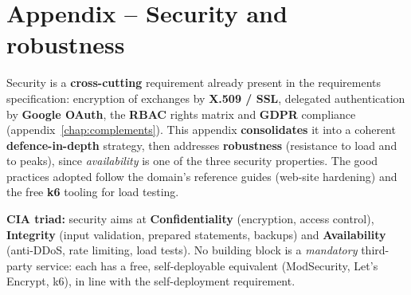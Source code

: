 
\chapter{Appendix -- Security and robustness}
\label{chap:securite}
Security is a \textbf{cross-cutting} requirement already present in the
requirements specification: encryption of exchanges by \textbf{X.509 / SSL},
delegated authentication by \textbf{Google OAuth}, the \textbf{RBAC} rights
matrix and \textbf{GDPR} compliance (appendix~\ref{chap:complements}). This
appendix \textbf{consolidates} it into a coherent \textbf{defence-in-depth}
strategy, then addresses \textbf{robustness} (resistance to load and to peaks),
since \emph{availability} is one of the three security properties. The good
practices adopted follow the domain's reference guides (web-site hardening) and
the free \textbf{k6} tooling for load testing.

\begin{encadre}
\textbf{CIA triad:} security aims at \textbf{Confidentiality} (encryption,
access control), \textbf{Integrity} (input validation, prepared statements,
backups) and \textbf{Availability} (anti-DDoS, rate limiting, load tests). No
building block is a \emph{mandatory} third-party service: each has a free,
self-deployable equivalent (ModSecurity, Let's Encrypt, k6), in line with the
self-deployment requirement.
\end{encadre}

